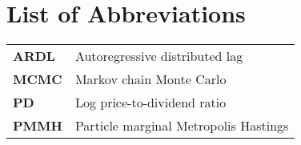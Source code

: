 \chapter{List of Abbreviations}
\begin{tabular}{ll}
\textbf{ARDL} & Autoregressive distributed lag \\
\textbf{MCMC} & Markov chain Monte Carlo \\
\textbf{PD} & Log price-to-dividend ratio \\
\textbf{PMMH} & Particle marginal Metropolis Hastings \\
\end{tabular}
